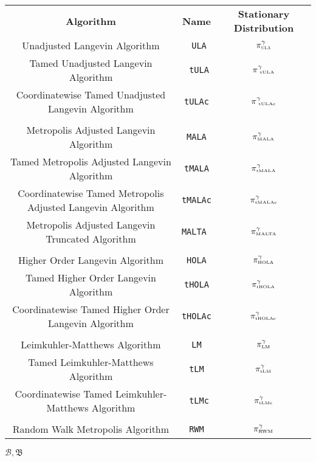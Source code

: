 \documentclass[a4paper]{article}
\theoremstyle{definition}
\begin{document}
\bgroup
\def\arraystretch{1.25}
\begin{center}
\begin{tabular}{ccc}
	\textbf{Algorithm} & \textbf{Name} & \textbf{Stationary Distribution} \\ 
	Unadjusted Langevin Algorithm &\texttt{ ULA} & \(\pi^{\gamma}_{\text{\tiny  \sc ULA}}\)\\ 
	Tamed Unadjusted Langevin Algorithm &\texttt{ tULA} & \(\pi^{\gamma}_{\text{ \tiny   tULA}}\) \\ 
	Coordinatewise Tamed Unadjusted Langevin Algorithm & \texttt{\tiny tULAc} & \(\pi^{\gamma}_{\text{ \tiny tULAc}}\) \\ 
	&  \\ 
	Metropolis Adjusted Langevin Algorithm & \texttt{MALA} & \(\pi^{\gamma}_{\text{\tiny MALA}}\) \\ 
	Tamed Metropolis Adjusted Langevin Algorithm & \texttt{tMALA} & \(\pi^{\gamma}_{\text{\tiny tMALA}}\) \\ 
	Coordinatewise Tamed Metropolis Adjusted Langevin Algorithm & \texttt{\tiny tMALAc} & \(\pi^{\gamma}_{\text{\tiny tMALAc}}\) \\ 
	Metropolis Adjusted Langevin Truncated  Algorithm & \texttt{MALTA } & \(\pi^{\gamma}_{\text{\tiny MALTA}}\)\\ 
	&  \\ 
	Higher Order Langevin Algorithm & \texttt{HOLA} & \(\pi^{\gamma}_{\text{\tiny HOLA}}\) \\ 
	Tamed Higher Order Langevin Algorithm & \texttt{tHOLA}  & \(\pi^{\gamma}_{\text{\tiny tHOLA}}\)\\ 
	Coordinatewise Tamed Higher Order Langevin Algorithm & \texttt{tHOLAc}&  \(\pi^{\gamma}_{\text{\tiny tHOLAc}}\) \\ 
	&  \\ 
	Leimkuhler-Matthews Algorithm & \texttt{LM} & \(\pi^{\gamma}_{\text{\tiny LM}}\) \\ 
	Tamed Leimkuhler-Matthews Algorithm & \texttt{tLM} & \(\pi^{\gamma}_{\text{\tiny tLM}}\)\\ 
	Coordinatewise Tamed Leimkuhler-Matthews Algorithm & \texttt{ tLMc} & \(\pi^{\gamma}_{\text{\tiny tLMc}}\) \\ 
	&  \\ 
	Random Walk Metropolis Algorithm & \texttt{RWM} & \(\pi^{\gamma}_{\text{\tiny RWM}}\) \\ 
\end{tabular} 
\end{center}
\(\mathcal{B}, \mathfrak{B}\)
\end{document}
